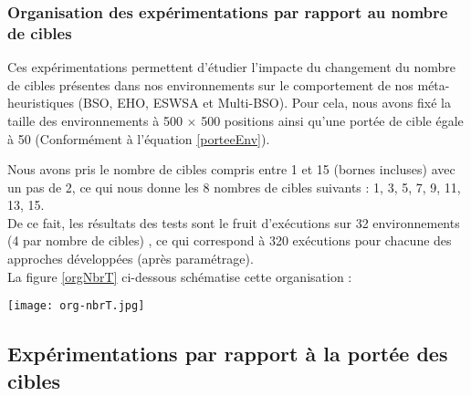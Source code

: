 	\subsubsection{Organisation des expérimentations par rapport au nombre de cibles}
	Ces expérimentations permettent d'étudier l'impacte du changement du nombre de cibles présentes dans nos environnements sur le comportement de nos méta-heuristiques (BSO, EHO, ESWSA et Multi-BSO).
	Pour cela, nous avons fixé la taille des environnements à 500 $\times$ 500 positions ainsi qu'une portée de cible égale à 50 (Conformément à l'équation \ref{porteeEnv}).
	
	Nous avons pris le nombre de cibles compris entre 1 et 15 (bornes incluses) avec un pas de 2, ce qui nous donne les 8 nombres de cibles suivants : 1, 3, 5, 7, 9, 11, 13, 15.\\
	
	De ce fait, les résultats des tests sont le fruit d'exécutions sur 32 environnements (4 par nombre de cibles) , ce qui correspond à 320 exécutions pour chacune des approches développées (après paramétrage).\\
	La figure \ref{orgNbrT} ci-dessous schématise cette organisation :
	
	\begin{center}	  
		\texttt{[image: org-nbrT.jpg]}%
		\vspace{-0.1 cm}
		\label{orgNbrT}%
	\end{center}
	
	
	

	
	
	\subsection{Expérimentations par rapport à la portée des cibles}
	
